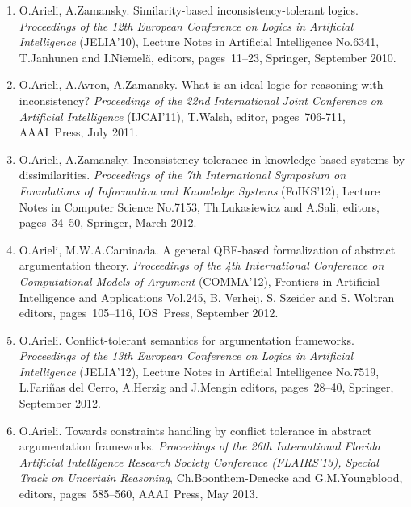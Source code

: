 \documentclass{article}
\begin{document}
\begin{enumerate}
   \item O.Arieli, A.Zamansky.
         Similarity-based inconsistency-tolerant logics.
         {\em Proceedings of the 12th European Conference on Logics in Artificial Intelligence\/}
         (JELIA'10), Lecture Notes in Artificial Intelligence No.6341,
         T.Janhunen and I.Niemel{\"a}, editors, pages~11--23, Springer, September 2010.

   \item O.Arieli, A.Avron, A.Zamansky.
         What is an ideal logic for reasoning with inconsistency?
         {\em Proceedings of the 22nd International Joint Conference on Artificial Intelligence\/}
         (IJCAI'11), T.Walsh, editor, pages~706-711, AAAI~Press, July 2011.

   \item O.Arieli, A.Zamansky.
         Inconsistency-tolerance in knowledge-based systems by dissimilarities.
         {\em Proceedings of the 7th International Symposium on Foundations of Information and Knowledge Systems\/}
         (FoIKS'12), Lecture Notes in Computer Science No.7153,
         Th.Lukasiewicz and A.Sali, editors, pages~34--50, Springer, March 2012.

   \item O.Arieli, M.W.A.Caminada.
         A general QBF-based formalization of abstract argumentation theory.
         {\em Proceedings of the 4th International Conference on Computational Models of Argument\/}
         (COMMA'12), Frontiers in Artificial Intelligence and Applications Vol.245,
         B. Verheij, S. Szeider and S. Woltran editors, pages~105--116, IOS~Press, September 2012.

   \item O.Arieli.
         Conflict-tolerant semantics for argumentation frameworks.
         {\em Proceedings of the 13th European Conference on Logics in Artificial Intelligence\/}
         (JELIA'12), Lecture Notes in Artificial Intelligence No.7519,
         L.Fari{\~n}as del Cerro, A.Herzig and J.Mengin editors, pages~28--40,
         Springer, September 2012.

   \item O.Arieli.
         Towards constraints handling by conflict tolerance in abstract argumentation frameworks.
         {\em Proceedings of the 26th International Florida Artificial Intelligence Research Society Conference
         (FLAIRS'13), Special Track on Uncertain Reasoning\/}, Ch.Boonthem-Denecke and G.M.Youngblood,
         editors, pages~585--560, AAAI~Press, May 2013.


\end{enumerate}
\end{document}
